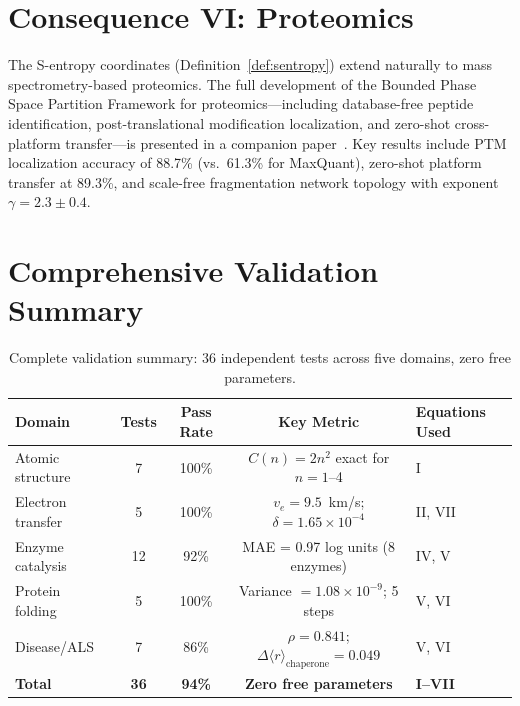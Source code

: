 \documentclass[aps,prx,superscriptaddress,twocolumn,10pt,a4paper,longbibliography,preprint]{revtex4-2}
\newcommand{\orderp}{\langle r \rangle}
\theoremstyle{definition}
\theoremstyle{remark}
\begin{document}
\section{Consequence VI: Proteomics}
\label{sec:proteomics}

The S-entropy coordinates (Definition~\ref{def:sentropy}) extend naturally to mass spectrometry-based proteomics. The full development of the Bounded Phase Space Partition Framework for proteomics---including database-free peptide identification, post-translational modification localization, and zero-shot cross-platform transfer---is presented in a companion paper~\cite{Sachikonye2026f}. Key results include PTM localization accuracy of 88.7\% (vs.\ 61.3\% for MaxQuant), zero-shot platform transfer at 89.3\%, and scale-free fragmentation network topology with exponent $\gamma = 2.3 \pm 0.4$.


\section{Comprehensive Validation Summary}
\label{sec:validation}

\begin{table}[!htbp]
\centering
\caption{Complete validation summary: 36 independent tests across five domains, zero free parameters.}
\label{tab:validation}
\begin{tabular}{lcccl}
\toprule
Domain & Tests & Pass Rate & Key Metric & Equations Used \\
\midrule
Atomic structure & 7 & 100\% & $C(n) = 2n^2$ exact for $n = 1$--4 & I \\
Electron transfer & 5 & 100\% & $v_e = 9.5$~km/s; $\delta = 1.65 \times 10^{-4}$ & II, VII \\
Enzyme catalysis & 12 & 92\% & MAE = 0.97 log units (8 enzymes) & IV, V \\
Protein folding & 5 & 100\% & Variance $= 1.08 \times 10^{-9}$; 5 steps & V, VI \\
Disease/ALS & 7 & 86\% & $\rho = 0.841$; $\Delta\orderp_{\text{chaperone}} = 0.049$ & V, VI \\
\midrule
\textbf{Total} & \textbf{36} & \textbf{94\%} & \textbf{Zero free parameters} & \textbf{I--VII} \\
\bottomrule
\end{tabular}
\end{table}
\end{document}
